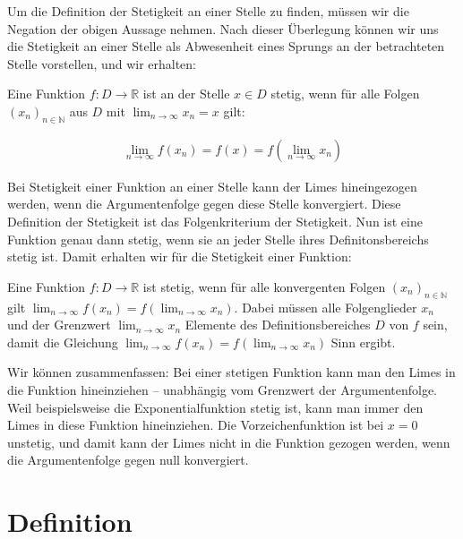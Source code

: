 \documentclass[fontsize=9pt,
               parskip=half-,
               DIV=14,
               listof=chapterentry,
               tocflat]{scrbook}
\begin{document}
Um die Definition der Stetigkeit an einer Stelle zu finden, müssen wir die Negation der obigen Aussage nehmen. Nach dieser Überlegung können wir uns die Stetigkeit an einer Stelle als Abwesenheit eines Sprungs an der betrachteten Stelle vorstellen, und wir erhalten:

\begin{importantparagraph*}
Eine Funktion $f:D\to \mathbb {R} $ ist an der Stelle $x\in D$ stetig, wenn für alle Folgen $(x_{n})_{n\in \mathbb {N} }$ aus $D$ mit $\lim _{n\to \infty }x_{n}=x$ gilt:

\begin{align*}
\lim _{n\to \infty }f(x_{n})=f(x)=f\left(\lim _{n\to \infty }x_{n}\right)
\end{align*}

\end{importantparagraph*}

Bei Stetigkeit einer Funktion an einer Stelle kann der Limes hineingezogen werden, wenn die Argumentenfolge gegen diese Stelle konvergiert. Diese Definition der Stetigkeit ist das Folgenkriterium der Stetigkeit. Nun ist eine Funktion genau dann stetig, wenn sie an jeder Stelle ihres Definitonsbereichs stetig ist. Damit erhalten wir für die Stetigkeit einer Funktion:

\begin{importantparagraph*}
Eine Funktion $f:D\to \mathbb {R} $ ist stetig, wenn für alle konvergenten Folgen $(x_{n})_{n\in \mathbb {N} }$ gilt $\lim _{n\to \infty }f(x_{n})=f(\lim _{n\to \infty }x_{n})$. Dabei müssen alle Folgenglieder $x_{n}$ und der Grenzwert $\lim _{n\to \infty }x_{n}$ Elemente des Definitionsbereiches $D$ von $f$ sein, damit die Gleichung $\lim _{n\to \infty }f(x_{n})=f\left(\lim _{n\to \infty }x_{n}\right)$ Sinn ergibt.

\end{importantparagraph*}

Wir können zusammenfassen: Bei einer stetigen Funktion kann man den Limes in die Funktion hineinziehen – unabhängig vom Grenzwert der Argumentenfolge. Weil beispielsweise die Exponentialfunktion stetig ist, kann man immer den Limes in diese Funktion hineinziehen. Die Vorzeichenfunktion ist bei $x=0$ unstetig, und damit kann der Limes nicht in die Funktion gezogen werden, wenn die Argumentenfolge gegen null konvergiert.

\section{Definition}
\end{document}
